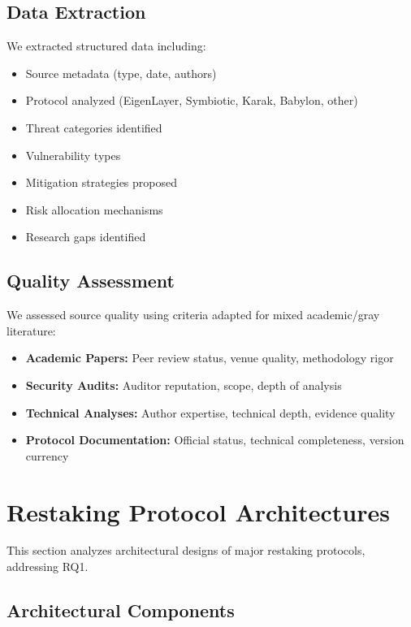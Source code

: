 \documentclass[runningheads]{llncs}
\begin{document}
\subsection{Data Extraction}

We extracted structured data including:
\begin{itemize}
    \item Source metadata (type, date, authors)
    \item Protocol analyzed (EigenLayer, Symbiotic, Karak, Babylon, other)
    \item Threat categories identified
    \item Vulnerability types
    \item Mitigation strategies proposed
    \item Risk allocation mechanisms
    \item Research gaps identified
\end{itemize}

\subsection{Quality Assessment}

We assessed source quality using criteria adapted for mixed academic/gray literature:
\begin{itemize}
    \item \textbf{Academic Papers:} Peer review status, venue quality, methodology rigor
    \item \textbf{Security Audits:} Auditor reputation, scope, depth of analysis
    \item \textbf{Technical Analyses:} Author expertise, technical depth, evidence quality
    \item \textbf{Protocol Documentation:} Official status, technical completeness, version currency
\end{itemize}

\vspace{-0.3cm}
\section{Restaking Protocol Architectures}
\label{sec:architecture}

This section analyzes architectural designs of major restaking protocols, addressing RQ1.

\subsection{Architectural Components}
\end{document}
